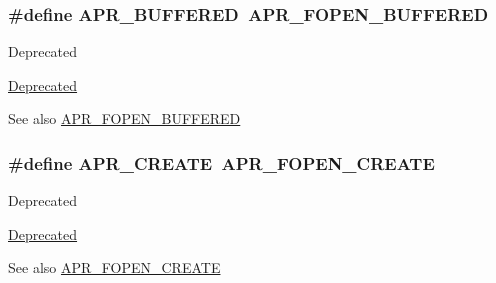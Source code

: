 \subsubsection[{\texorpdfstring{A\+P\+R\+\_\+\+B\+U\+F\+F\+E\+R\+ED}{APR_BUFFERED}}]{\setlength{\rightskip}{0pt plus 5cm}\#define A\+P\+R\+\_\+\+B\+U\+F\+F\+E\+R\+ED~{\bf A\+P\+R\+\_\+\+F\+O\+P\+E\+N\+\_\+\+B\+U\+F\+F\+E\+R\+ED}}\hypertarget{group__apr__file__open__flags_ga6edc818199e8b90e3dabf97c42a27158}{}\label{group__apr__file__open__flags_ga6edc818199e8b90e3dabf97c42a27158}
\begin{DoxyRefDesc}{Deprecated}
\item[\hyperlink{deprecated__deprecated000031}{Deprecated}]\end{DoxyRefDesc}
\begin{DoxySeeAlso}{See also}
\hyperlink{group__apr__file__open__flags_gac48fd4c853c9f561632a2e8aaf5d8d97}{A\+P\+R\+\_\+\+F\+O\+P\+E\+N\+\_\+\+B\+U\+F\+F\+E\+R\+ED} 
\end{DoxySeeAlso}
\subsubsection[{\texorpdfstring{A\+P\+R\+\_\+\+C\+R\+E\+A\+TE}{APR_CREATE}}]{\setlength{\rightskip}{0pt plus 5cm}\#define A\+P\+R\+\_\+\+C\+R\+E\+A\+TE~{\bf A\+P\+R\+\_\+\+F\+O\+P\+E\+N\+\_\+\+C\+R\+E\+A\+TE}}\hypertarget{group__apr__file__open__flags_gac210e96bc821dbaa83c326e775dad028}{}\label{group__apr__file__open__flags_gac210e96bc821dbaa83c326e775dad028}
\begin{DoxyRefDesc}{Deprecated}
\item[\hyperlink{deprecated__deprecated000026}{Deprecated}]\end{DoxyRefDesc}
\begin{DoxySeeAlso}{See also}
\hyperlink{group__apr__file__open__flags_gafe94f21ccbf411172e70e7f473af251a}{A\+P\+R\+\_\+\+F\+O\+P\+E\+N\+\_\+\+C\+R\+E\+A\+TE} 
\end{DoxySeeAlso}
